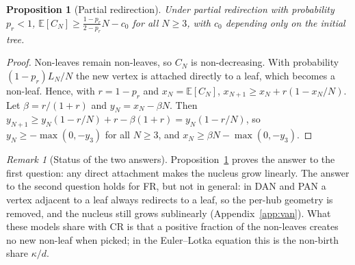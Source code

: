 \documentclass[11pt]{article}
\theoremstyle{plain}
\newtheorem{proposition}[theorem]{Proposition}
\theoremstyle{definition}
\theoremstyle{remark}
\newtheorem{remark}[theorem]{Remark}
\begin{document}
\begin{proposition}[Partial redirection]\label{c:prop:partial}
Under partial redirection with probability $p_r<1$, $\mathbb{E}[C_N]\ge\frac{1-p_r}{2-p_r}N-c_0$ for all $N\ge3$, with $c_0$ depending only on the initial tree.
\end{proposition}

\begin{proof}
Non-leaves remain non-leaves, so $C_N$ is non-decreasing. With probability $(1-p_r)L_N/N$ the new vertex is attached directly to a leaf, which becomes a non-leaf. Hence, with $r=1-p_r$ and $x_N=\mathbb{E}[C_N]$, $x_{N+1}\ge x_N+r(1-x_N/N)$. Let $\beta=r/(1+r)$ and $y_N=x_N-\beta N$. Then $y_{N+1}\ge y_N(1-r/N)+r-\beta(1+r)=y_N(1-r/N)$, so $y_N\ge-\max(0,-y_3)$ for all $N\ge3$, and $x_N\ge\beta N-\max(0,-y_3)$.
\end{proof}

\begin{remark}[Status of the two answers]
Proposition~\ref{c:prop:partial} proves the answer to the first question: any direct attachment makes the nucleus grow linearly. The answer to the second question holds for FR, but not in general: in DAN and PAN \cite{HKRZ2026} a vertex adjacent to a leaf always redirects to a leaf, so the per-hub geometry is removed, and the nucleus still grows sublinearly (Appendix~\ref{app:van}). What these models share with CR is that a positive fraction of the non-leaves creates no new non-leaf when picked; in the Euler--Lotka equation this is the non-birth share $\kappa/d$.
\end{remark}
\end{document}
